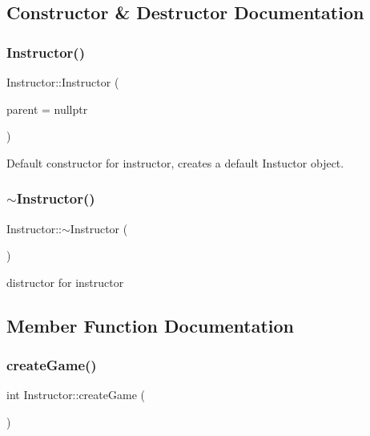 \subsection{Constructor \& Destructor Documentation}
\mbox{\label{class_instructor_a30fffbd3cab548e3b30e061712bfdbe5}} 
\subsubsection{\texorpdfstring{Instructor()}{Instructor()}}
{\footnotesize\ttfamily Instructor\+::\+Instructor (\begin{DoxyParamCaption}\item[{Q\+Object $\ast$}]{parent = {\ttfamily nullptr} }\end{DoxyParamCaption})\hspace{0.3cm}{\ttfamily [explicit]}}



Default constructor for instructor, creates a default Instuctor object. 

\mbox{\label{class_instructor_aa204bec2066fabdd81a065999b01816c}} 
\subsubsection{\texorpdfstring{$\sim$\+Instructor()}{~Instructor()}}
{\footnotesize\ttfamily Instructor\+::$\sim$\+Instructor (\begin{DoxyParamCaption}{ }\end{DoxyParamCaption})}



distructor for instructor 



\subsection{Member Function Documentation}
\mbox{\label{class_instructor_a9fca4b1272f062d14ffb5bb89b10b6f8}} 
\subsubsection{\texorpdfstring{create\+Game()}{createGame()}}
{\footnotesize\ttfamily int Instructor\+::create\+Game (\begin{DoxyParamCaption}{ }\end{DoxyParamCaption})\hspace{0.3cm}{\ttfamily [private]}}



